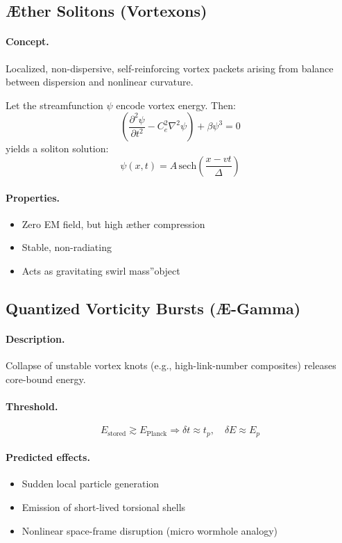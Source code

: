 \documentclass[12pt]{article}
\begin{document}
\subsection{Æther Solitons (Vortexons)}

\paragraph{Concept.} Localized, non-dispersive, self-reinforcing vortex packets arising from balance between dispersion and nonlinear curvature.

Let the streamfunction \( \psi \) encode vortex energy. Then:
\[
\left( \frac{\partial^2 \psi}{\partial t^2}
- C_e^2 \nabla^2 \psi \right) + \beta \psi^3 = 0
\]
yields a soliton solution:
\[
\psi(x,t) = A\,\text{sech}\left( \frac{x - v t}{\Delta} \right)
\]

\paragraph{Properties.}
\begin{itemize}
  \item Zero EM field, but high æther compression
  \item Stable, non-radiating
  \item Acts as gravitating \grqq swirl mass\textquotedblright object
\end{itemize}

\subsection{Quantized Vorticity Bursts (Æ-Gamma)}

\paragraph{Description.} Collapse of unstable vortex knots (e.g., high-link-number composites) releases core-bound energy.

\paragraph{Threshold.}
\[
E_\text{stored} \gtrsim E_\text{Planck} \Rightarrow \delta t \approx t_p,\quad \delta E \approx E_p
\]

\paragraph{Predicted effects.}
\begin{itemize}
  \item Sudden local particle generation
  \item Emission of short-lived torsional shells
  \item Nonlinear space-frame disruption (micro wormhole analogy)
\end{itemize}
\end{document}

